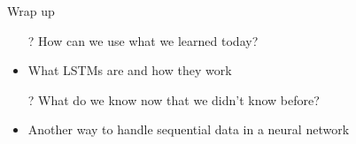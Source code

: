 \documentclass[aspectratio=169]{beamer}
\begin{document}
\begin{frame}{Wrap up}
\begin{itemize}
	\item[?] How can we use what we learned today?
	\item What LSTMs are and how they work
	\vspace{2em}
	\item[?] What do we know now that we didn't know before?
	\item Another way to handle sequential data in a neural network
\end{itemize}


\end{frame}
\end{document}
